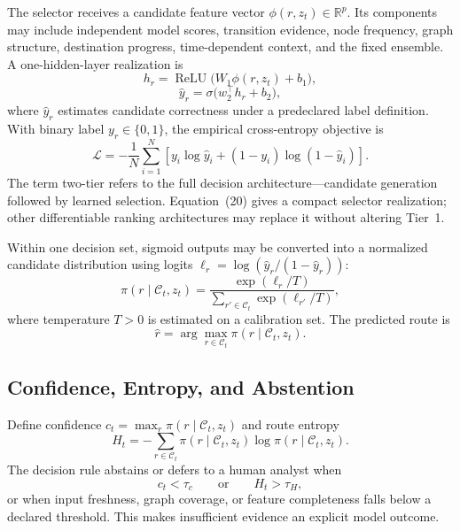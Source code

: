\documentclass[11pt,letterpaper]{article}
\newcommand{\Ccal}{\mathcal{C}}
\newcommand{\ReLU}{\operatorname{ReLU}}
\begin{document}
The selector receives a candidate feature vector $\phi(r,z_t)\in\mathbb{R}^p$. Its components may include independent model scores, transition evidence, node frequency, graph structure, destination progress, time-dependent context, and the fixed ensemble. A one-hidden-layer realization is
\begin{equation}
h_r=\ReLU\bigl(W_1\phi(r,z_t)+b_1\bigr),
\end{equation}
\begin{equation}
\widehat y_r=\sigma\bigl(w_2^\top h_r+b_2\bigr),
\end{equation}
where $\widehat y_r$ estimates candidate correctness under a predeclared label definition. With binary label $y_r\in\{0,1\}$, the empirical cross-entropy objective is
\begin{equation}
\mathcal{L}=-\frac{1}{N}\sum_{i=1}^{N}
\left[y_i\log\widehat y_i+(1-y_i)\log(1-\widehat y_i)\right].
\end{equation}
The term two-tier refers to the full decision architecture---candidate generation followed by learned selection. Equation~(20) gives a compact selector realization; other differentiable ranking architectures may replace it without altering Tier~1.

Within one decision set, sigmoid outputs may be converted into a normalized candidate distribution using logits $\ell_r=\log(\widehat y_r/(1-\widehat y_r))$:
\begin{equation}
\pi(r\mid\Ccal_t,z_t)=
\frac{\exp(\ell_r/T)}{\sum_{r'\in\Ccal_t}\exp(\ell_{r'}/T)},
\end{equation}
where temperature $T>0$ is estimated on a calibration set. The predicted route is
\begin{equation}
\widehat r=\arg\max_{r\in\Ccal_t}\pi(r\mid\Ccal_t,z_t).
\end{equation}

\subsection{Confidence, Entropy, and Abstention}

Define confidence $c_t=\max_r\pi(r\mid\Ccal_t,z_t)$ and route entropy
\begin{equation}
H_t=-\sum_{r\in\Ccal_t}\pi(r\mid\Ccal_t,z_t)
\log\pi(r\mid\Ccal_t,z_t).
\end{equation}
The decision rule abstains or defers to a human analyst when
\begin{equation}
c_t<\tau_c \qquad \text{or} \qquad H_t>\tau_H,
\end{equation}
or when input freshness, graph coverage, or feature completeness falls below a declared threshold. This makes insufficient evidence an explicit model outcome.
\end{document}
